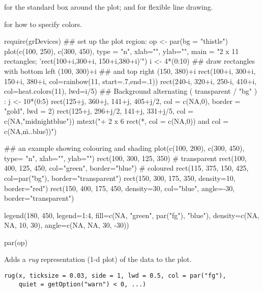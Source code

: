 %
\begin{SeeAlso}\relax
{} for the standard box around the plot;
 and  for flexible line
drawing.

 for how to specify colors.
\end{SeeAlso}
%
\begin{Examples}
\begin{ExampleCode}
require(grDevices)
## set up the plot region:
op <- par(bg = "thistle")
plot(c(100, 250), c(300, 450), type = "n", xlab="", ylab="",
     main = "2 x 11 rectangles; 'rect(100+i,300+i,  150+i,380+i)'")
i <- 4*(0:10)
## draw rectangles with bottom left (100, 300)+i
## and top right (150, 380)+i
rect(100+i, 300+i, 150+i, 380+i, col=rainbow(11, start=.7,end=.1))
rect(240-i, 320+i, 250-i, 410+i, col=heat.colors(11), lwd=i/5)
## Background alternating  ( transparent / "bg" ) :
j <- 10*(0:5)
rect(125+j, 360+j,   141+j, 405+j/2, col = c(NA,0),
     border = "gold", lwd = 2)
rect(125+j, 296+j/2, 141+j, 331+j/5, col = c(NA,"midnightblue"))
mtext("+  2 x 6 rect(*, col = c(NA,0)) and  col = c(NA,\"m..blue\"))")

## an example showing colouring and shading
plot(c(100, 200), c(300, 450), type= "n", xlab="", ylab="")
rect(100, 300, 125, 350) # transparent
rect(100, 400, 125, 450, col="green", border="blue") # coloured
rect(115, 375, 150, 425, col=par("bg"), border="transparent")
rect(150, 300, 175, 350, density=10, border="red")
rect(150, 400, 175, 450, density=30, col="blue",
     angle=-30, border="transparent")

legend(180, 450, legend=1:4, fill=c(NA, "green", par("fg"), "blue"),
       density=c(NA, NA, 10, 30), angle=c(NA, NA, 30, -30))

par(op)
\end{ExampleCode}
\end{Examples}
%
\begin{Description}\relax
Adds a \emph{rug} representation (1-d plot) of the data to the plot.
\end{Description}
%
\begin{Usage}
\begin{verbatim}
rug(x, ticksize = 0.03, side = 1, lwd = 0.5, col = par("fg"),
    quiet = getOption("warn") < 0, ...)
\end{verbatim}
\end{Usage}
%
